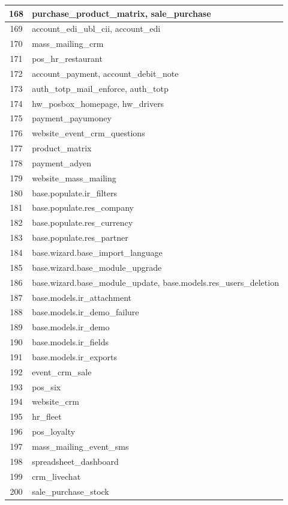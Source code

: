 \begin{small}
\begin{longtable}{|c|p{14cm}|}
168 & purchase{\_}product{\_}matrix, sale{\_}purchase \\ \hline
169 & account{\_}edi{\_}ubl{\_}cii, account{\_}edi \\ \hline
170 & mass{\_}mailing{\_}crm \\ \hline
171 & pos{\_}hr{\_}restaurant \\ \hline
172 & account{\_}payment, account{\_}debit{\_}note \\ \hline
173 & auth{\_}totp{\_}mail{\_}enforce, auth{\_}totp \\ \hline
174 & hw{\_}posbox{\_}homepage, hw{\_}drivers \\ \hline
175 & payment{\_}payumoney \\ \hline
176 & website{\_}event{\_}crm{\_}questions \\ \hline
177 & product{\_}matrix \\ \hline
178 & payment{\_}adyen \\ \hline
179 & website{\_}mass{\_}mailing \\ \hline
180 & base.populate.ir{\_}filters \\ \hline
181 & base.populate.res{\_}company \\ \hline
182 & base.populate.res{\_}currency \\ \hline
183 & base.populate.res{\_}partner \\ \hline
184 & base.wizard.base{\_}import{\_}language \\ \hline
185 & base.wizard.base{\_}module{\_}upgrade \\ \hline
186 & base.wizard.base{\_}module{\_}update, base.models.res{\_}users{\_}deletion \\ \hline
187 & base.models.ir{\_}attachment \\ \hline
188 & base.models.ir{\_}demo{\_}failure \\ \hline
189 & base.models.ir{\_}demo \\ \hline
190 & base.models.ir{\_}fields \\ \hline
191 & base.models.ir{\_}exports \\ \hline
192 & event{\_}crm{\_}sale \\ \hline
193 & pos{\_}six \\ \hline
194 & website{\_}crm \\ \hline
195 & hr{\_}fleet \\ \hline
196 & pos{\_}loyalty \\ \hline
197 & mass{\_}mailing{\_}event{\_}sms \\ \hline
198 & spreadsheet{\_}dashboard \\ \hline
199 & crm{\_}livechat \\ \hline
200 & sale{\_}purchase{\_}stock \\ \hline
\end{longtable}
\end{small}
\endgroup